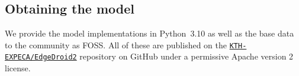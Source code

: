
\subsection{Obtaining the model}\label{ssec:model:obtaining}


We provide the model implementations in Python~\num{3.10} as well as the base data to the community as \gls{FOSS}.
All of these are published on the \href{https://github.com/KTH-EXPECA/EdgeDroid2}{\texttt{KTH-EXPECA/EdgeDroid2}} repository on GitHub under a permissive Apache version 2 license.
